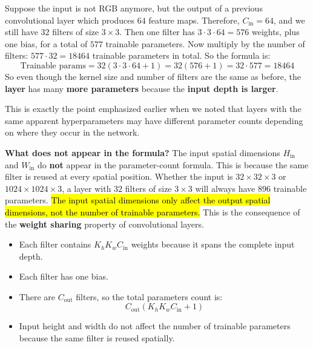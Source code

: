 \highspace
\begin{examplebox}
    Suppose the input is not RGB anymore, but the output of a previous convolutional layer which produces $64$ feature maps. Therefore, $C_{\text{in}} = 64$, and we still have $32$ filters of size $3 \times 3$. Then one filter has $3 \cdot 3 \cdot 64 = 576$ weights, plus one bias, for a total of $577$ trainable parameters. Now multiply by the number of filters: $577 \cdot 32 = 18464$ trainable parameters in total. So the formula is:
    \begin{equation*}
        \text{Trainable params} = 32 \left( 3 \cdot 3 \cdot 64 + 1 \right) = 32 \left( 576 + 1 \right) = 32 \cdot 577 = 18464
    \end{equation*}
    So even though the kernel size and number of filters are the same as before, the \textbf{layer} has many \textbf{more parameters} because the \textbf{input depth is larger}.

    This is exactly the point emphasized earlier when we noted that layers with the same apparent hyperparameters may have different parameter counts depending on where they occur in the network.
\end{examplebox}
\noindent
\textcolor{Green3}{ \textbf{What does not appear in the formula?}} The input spatial dimensions $H_{\text{in}}$ and $W_{\text{in}}$ do \textbf{not} appear in the parameter-count formula. This is because the same filter is reused at every spatial position. Whether the input is $32 \times 32 \times 3$ or $1024 \times 1024 \times 3$, a layer with $32$ filters of size $3 \times 3$ will always have $896$ trainable parameters. \hl{The input spatial dimensions only affect the output spatial dimensions, not the number of trainable parameters.} This is the consequence of the \textbf{weight sharing} property of convolutional layers.

\highspace
\begin{takeawaysbox}
    \begin{itemize}
        \item Each filter contains $K_h K_w C_{\text{in}}$ weights because it spans the complete input depth.
        \item Each filter has one bias.
        \item There are $C_{\text{out}}$ filters, so the total parameters count is:
        \begin{equation*}
            C_{\text{out}} \left( K_h K_w C_{\text{in}} + 1 \right)
        \end{equation*}
        \item Input height and width do not affect the number of trainable parameters because the same filter is reused spatially.
    \end{itemize}
\end{takeawaysbox}